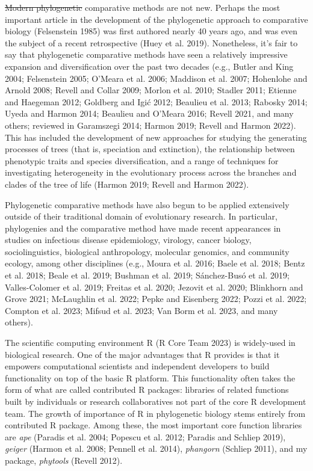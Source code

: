 \documentclass[fleqn,10pt,lineno]{wlpeerj}
\providecommand{\DIFaddtex}[1]{{\protect\color{blue}\uwave{#1}}} %
\providecommand{\DIFdeltex}[1]{{\protect\color{red}\sout{#1}}}                      %
\providecommand{\DIFaddbegin}{} %
\providecommand{\DIFaddend}{} %
\providecommand{\DIFdelbegin}{} %
\providecommand{\DIFdelend}{} %
\providecommand{\DIFadd}[1]{\texorpdfstring{\DIFaddtex{#1}}{#1}} %
\providecommand{\DIFdel}[1]{\texorpdfstring{\DIFdeltex{#1}}{}} %
\newcommand{\DIFscaledelfig}{0.5}
\newlength{\DIFdelgraphicswidth} %
\newlength{\DIFdelgraphicsheight} %
\newcommand{\DIFaddincludegraphics}[2][]{{\color{blue}\fbox{\DIFOincludegraphics[#1]{#2}}}} %
\newcommand{\DIFdelincludegraphics}[2][]{%
\sbox{\DIFdelgraphicsbox}{\DIFOincludegraphics[#1]{#2}}%
\settoboxwidth{\DIFdelgraphicswidth}{\DIFdelgraphicsbox} %
\settoboxtotalheight{\DIFdelgraphicsheight}{\DIFdelgraphicsbox} %
\scalebox{\DIFscaledelfig}{%
\parbox[b]{\DIFdelgraphicswidth}{\usebox{\DIFdelgraphicsbox}\\[-\baselineskip] \rule{\DIFdelgraphicswidth}{0em}}\llap{\resizebox{\DIFdelgraphicswidth}{\DIFdelgraphicsheight}{%
\setlength{\unitlength}{\DIFdelgraphicswidth}%
\begin{picture}(1,1)%
\thicklines\linethickness{2pt} %
{\color[rgb]{1,0,0}\put(0,0){\framebox(1,1){}}}%
{\color[rgb]{1,0,0}\put(0,0){\line( 1,1){1}}}%
{\color[rgb]{1,0,0}\put(0,1){\line(1,-1){1}}}%
\end{picture}%
}\hspace*{3pt}}} %
} %
\DeclareRobustCommand{\DIFaddbegin}{\DIFOaddbegin \let\includegraphics\DIFaddincludegraphics} %
\DeclareRobustCommand{\DIFaddend}{\DIFOaddend \let\includegraphics\DIFOincludegraphics} %
\DeclareRobustCommand{\DIFdelbegin}{\DIFOdelbegin \let\includegraphics\DIFdelincludegraphics} %
\DeclareRobustCommand{\DIFdelend}{\DIFOaddend \let\includegraphics\DIFOincludegraphics} %
\begin{document}
\DIFdelbegin \DIFdel{Modern phylogenetic }\DIFdelend \DIFaddbegin \DIFadd{Phylogenetic }\DIFaddend comparative methods are not new. Perhaps the most important
article in the development of the phylogenetic approach to comparative
biology (Felsenstein 1985) was first authored nearly 40 years ago, and
was even the subject of a recent retrospective (Huey et al. 2019).
Nonetheless, it's fair to say that phylogenetic comparative methods have
seen a relatively impressive expansion and diversification over the past
two decades (e.g., Butler and King 2004; Felsenstein 2005; O'Meara et
al. 2006; Maddison et al. 2007; Hohenlohe and Arnold 2008; Revell and
Collar 2009; Morlon et al. 2010; Stadler 2011; Etienne and Haegeman
2012; Goldberg and Igić 2012; Beaulieu et al. 2013; Rabosky 2014; Uyeda
and Harmon 2014; Beaulieu and O'Meara 2016; Revell 2021\DIFaddbegin \DIFadd{; MacPherson et
al. 2022}\DIFaddend , and many others; reviewed in \DIFaddbegin \DIFadd{OMeara 2012; }\DIFaddend Garamszegi 2014;
Harmon 2019; Revell and Harmon 2022). This has included the development
of new approaches for studying the generating processes of trees (that
is, speciation and extinction), the relationship between phenotypic
traits and species diversification, and a range of techniques for
investigating heterogeneity in the evolutionary process across the
branches and clades of the tree of life (\DIFaddbegin \DIFadd{OMeara 2012; }\DIFaddend Harmon 2019;
Revell and Harmon 2022).

Phylogenetic comparative methods have also begun to be applied
extensively outside of their traditional domain of evolutionary
research. In particular, phylogenies and the comparative method have
made recent appearances in studies on infectious disease epidemiology,
virology, cancer biology, sociolinguistics, biological anthropology,
molecular genomics, and community ecology, among other disciplines
(e.g., Moura et al. 2016; Baele et al. 2018; Bentz et al. 2018; Beale et
al. 2019; Bushman et al. 2019; Sánchez-Busó et al. 2019; Valles-Colomer
et al. 2019; Freitas et al. 2020; Jezovit et al. 2020; Blinkhorn and
Grove 2021; McLaughlin et al. 2022; Pepke and Eisenberg 2022; Pozzi et
al. 2022; Compton et al. 2023; Mifsud et al. 2023; Van Borm et al. 2023,
and many others).

The scientific computing environment R (R Core Team 2023) is widely-used
in biological research. One of the major advantages that R provides is
that it empowers computational scientists and independent developers to
build functionality on top of the basic R platform. This functionality
often takes the form of what are called contributed R packages:
libraries of related functions built by individuals or research
collaboratives not part of the core R development team. The growth of
importance of R in phylogenetic biology stems entirely from contributed
R package. Among these, the most important core function libraries are
\emph{ape} (Paradis et al. 2004; Popescu et al. 2012; Paradis and
Schliep 2019), \emph{geiger} (Harmon et al. 2008; Pennell et al. 2014),
\emph{phangorn} (Schliep 2011), and my package, \emph{phytools} (Revell
2012).
\end{document}
